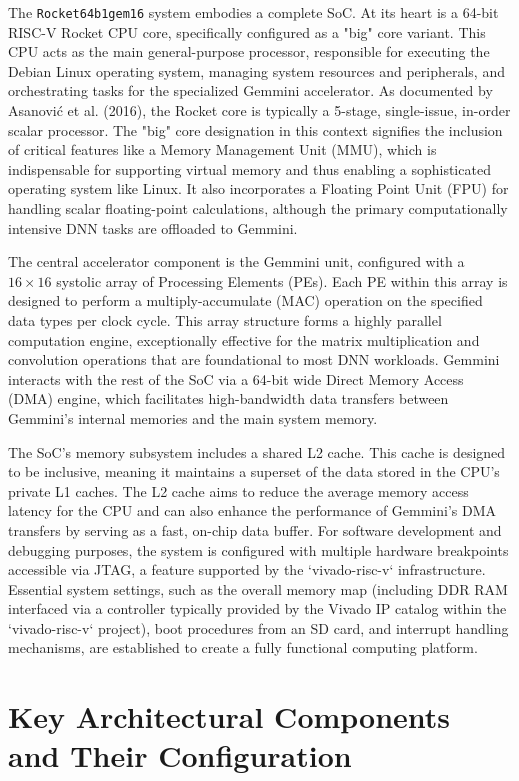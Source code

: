The \texttt{Rocket64b1gem16} system embodies a complete SoC. At its heart is a 64-bit RISC-V Rocket CPU core, specifically configured as a "big" core variant. This CPU acts as the main general-purpose processor, responsible for executing the Debian Linux operating system, managing system resources and peripherals, and orchestrating tasks for the specialized Gemmini accelerator. As documented by Asanović et al. (2016), the Rocket core is typically a 5-stage, single-issue, in-order scalar processor. The "big" core designation in this context signifies the inclusion of critical features like a Memory Management Unit (MMU), which is indispensable for supporting virtual memory and thus enabling a sophisticated operating system like Linux. It also incorporates a Floating Point Unit (FPU) for handling scalar floating-point calculations, although the primary computationally intensive DNN tasks are offloaded to Gemmini.

The central accelerator component is the Gemmini unit, configured with a $16 \times 16$ systolic array of Processing Elements (PEs). Each PE within this array is designed to perform a multiply-accumulate (MAC) operation on the specified data types per clock cycle. This array structure forms a highly parallel computation engine, exceptionally effective for the matrix multiplication and convolution operations that are foundational to most DNN workloads. Gemmini interacts with the rest of the SoC via a 64-bit wide Direct Memory Access (DMA) engine, which facilitates high-bandwidth data transfers between Gemmini's internal memories and the main system memory.

The SoC’s memory subsystem includes a shared L2 cache. This cache is designed to be inclusive, meaning it maintains a superset of the data stored in the CPU's private L1 caches. The L2 cache aims to reduce the average memory access latency for the CPU and can also enhance the performance of Gemmini's DMA transfers by serving as a fast, on-chip data buffer. For software development and debugging purposes, the system is configured with multiple hardware breakpoints accessible via JTAG, a feature supported by the `vivado-risc-v` infrastructure. Essential system settings, such as the overall memory map (including DDR RAM interfaced via a controller typically provided by the Vivado IP catalog within the `vivado-risc-v` project), boot procedures from an SD card, and interrupt handling mechanisms, are established to create a fully functional computing platform.

\section{Key Architectural Components and Their Configuration}
\label{sec:key_config_components}

